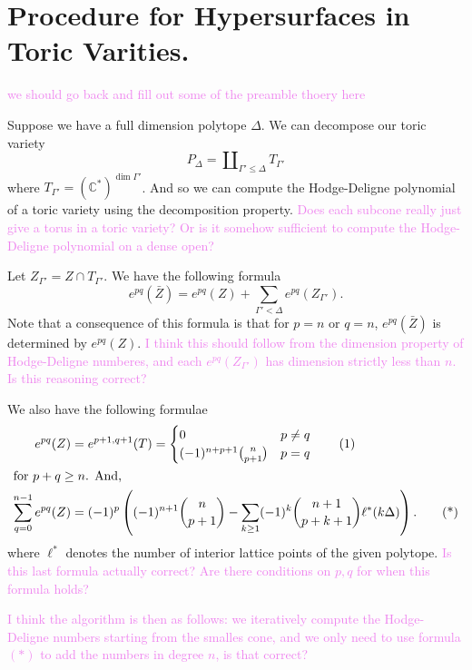 \documentclass{article}
\theoremstyle{definition}
\theoremstyle{remark}
\newcommand{\wg}[1]{\textcolor{violet}{#1}}
\newcommand{\C}{\mathbb C}
\begin{document}
\section{Procedure for Hypersurfaces in Toric Varities.}

\wg{we should go back and fill out some of the preamble thoery here}

Suppose we have a full dimension polytope $\Delta$. We can decompose our toric
variety
\[
    P_\Delta = \amalg_{\Gamma' \leq \Delta} T_{\Gamma'}
\]
where $T_{\Gamma'} = (\C^*)^{\dim \Gamma'}$. And so we can compute the 
Hodge-Deligne polynomial of a toric variety using the decomposition property.
\wg{Does each subcone really just give a torus in a toric variety? Or is it somehow sufficient to compute the Hodge-Deligne polynomial on a dense open?}

Let $Z_{\Gamma' } = Z \cap T_{\Gamma'}$. We have the following formula
\[
    e^{pq}(\bar Z) = e^{pq}(Z) +\sum_{\Gamma' < \Delta} e^{pq}(Z_{\Gamma'}).
\] 
Note that a consequence of this formula is that 
for $p = n$ or $q = n$, $e^{pq}(\bar Z)$ is determined by 
$e^{pq}(Z)$. 
\wg{I think this should follow from the dimension property of Hodge-Deligne
numberes, and each $e^{pq}(Z_{\Gamma'})$ has dimension strictly less than $n$.
Is this reasoning correct?}

We also have the following formulae
\begin{align*}
    e^{pq} (Z) &= e^{p+1, q+1}(T) = \begin{cases}
        0 & p \neq q \\
        (-1)^{n + p + 1} \binom{n}{p+1} & p = q
    \end{cases} \tag{1}\\
    \intertext{for $p + q \geq n$. And,}
    \sum\limits_{q = 0}^{n-1} e^{pq}(Z) &=
        (-1)^{p}\left((-1)^{n+1} \binom{n}{p+1} 
        - \sum_{k \geq 1} (-1)^{k} \binom{n+1}{p + k + 1} \ell^*(k \Delta)\right). \tag{*}
\end{align*}
where $\ell^*$ denotes the number of interior lattice points of the given
polytope.
\wg{Is this last formula actually correct? Are there conditions on
$p,q$ for when this formula holds?}

\wg{I think the algorithm is then as follows: we iteratively compute 
the Hodge-Deligne numbers starting from the smalles cone,
and we only need to use formula $(*)$ to add the numbers in degree
$n$, is that correct?}
\end{document}
